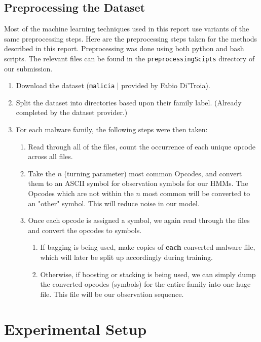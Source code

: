 \documentclass[12pt]{article}
\begin{document}
\subsection{Preprocessing the Dataset}
Most of the machine learning techniques used in this report use variants of the same preprocessing steps. Here are the preprocessing steps taken for the methods described in this report. Preprocessing was done using both python and bash scripts. The relevant files can be found in the \texttt{preprocessingScipts} directory of our submission.
  \begin{enumerate}
  \item Download the dataset (\texttt{malicia} | provided by Fabio Di'Troia).
    \item Split the dataset into directories based upon their family label. (Already completed by the dataset provider.)
    \item For each malware family, the following steps were then taken:
      \begin{enumerate}
        \item Read through all of the files, count the occurrence of each unique opcode across all files.
        \item Take the $n$ (turning parameter) most common Opcodes, and convert them to an ASCII symbol for observation symbols for our HMMs. The Opcodes which are not within the $n$ most common will be converted to an "other" symbol. This will reduce noise in our model.
        \item Once each opcode is assigned a symbol, we again read through the files and convert the opcodes to symbols.
        \begin{enumerate}
          \item If bagging is being used, make copies of \textbf{each} converted malware file, which will later be split up accordingly during training.
          \item Otherwise, if boosting or stacking is being used, we can simply dump the converted opcodes (symbols) for the entire family into one huge file. This file will be our observation sequence.
        \end{enumerate}
      \end{enumerate}
  \end{enumerate}




\section{Experimental Setup}
\end{document}
